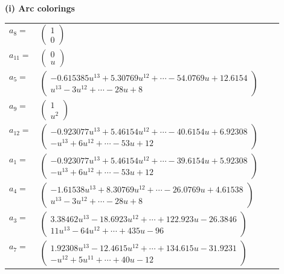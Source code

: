 \documentclass[1p]{elsarticle_modified}
\theoremstyle{definition}
\begin{document}
\flushleft \textbf{(i) Arc colorings}\\
\begin{tabular}{m{7pt} m{180pt} m{7pt} m{180pt} }
\flushright $a_{8}=$&$\begin{pmatrix}1\\0\end{pmatrix}$ \\
\flushright $a_{11}=$&$\begin{pmatrix}0\\u\end{pmatrix}$ \\
\flushright $a_{5}=$&$\begin{pmatrix}-0.615385 u^{13}+5.30769 u^{12}+\cdots-54.0769 u+12.6154\\u^{13}-3 u^{12}+\cdots-28 u+8\end{pmatrix}$ \\
\flushright $a_{9}=$&$\begin{pmatrix}1\\u^2\end{pmatrix}$ \\
\flushright $a_{12}=$&$\begin{pmatrix}-0.923077 u^{13}+5.46154 u^{12}+\cdots-40.6154 u+6.92308\\- u^{13}+6 u^{12}+\cdots-53 u+12\end{pmatrix}$ \\
\flushright $a_{1}=$&$\begin{pmatrix}-0.923077 u^{13}+5.46154 u^{12}+\cdots-39.6154 u+5.92308\\- u^{13}+6 u^{12}+\cdots-53 u+12\end{pmatrix}$ \\
\flushright $a_{4}=$&$\begin{pmatrix}-1.61538 u^{13}+8.30769 u^{12}+\cdots-26.0769 u+4.61538\\u^{13}-3 u^{12}+\cdots-28 u+8\end{pmatrix}$ \\
\flushright $a_{3}=$&$\begin{pmatrix}3.38462 u^{13}-18.6923 u^{12}+\cdots+122.923 u-26.3846\\11 u^{13}-64 u^{12}+\cdots+435 u-96\end{pmatrix}$ \\
\flushright $a_{7}=$&$\begin{pmatrix}1.92308 u^{13}-12.4615 u^{12}+\cdots+134.615 u-31.9231\\- u^{12}+5 u^{11}+\cdots+40 u-12\end{pmatrix}$ \\

\end{tabular}
\end{document}

